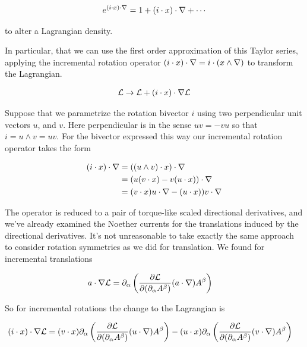 \begin{align}\label{eqn:rotationCurrents:foo1}
e^{(i \cdot x) \cdot \nabla} = 1 + (i \cdot x) \cdot \nabla + \cdots
\end{align}

to alter a Lagrangian density.

In particular, that we can use the first order approximation of this Taylor series, applying the incremental rotation operator $(i \cdot x) \cdot \nabla = i \cdot (x \wedge \nabla)$ to transform the Lagrangian.

\begin{align}\label{eqn:rotationCurrents:foo2}
\mathcal{L} \rightarrow \mathcal{L} + (i \cdot x) \cdot \nabla \mathcal{L}
\end{align}

Suppose that we parametrize the rotation bivector $i$ using two perpendicular unit vectors $u$, and $v$.  Here perpendicular is in the sense $u v = -v u$ so that $i = u \wedge v = u v$.  For the bivector expressed this way our incremental rotation operator takes the form

\begin{align*}
(i \cdot x) \cdot \nabla 
&=
((u \wedge v) \cdot x) \cdot \nabla \\
&=
(u (v \cdot x) - v (u \cdot x)) \cdot \nabla \\
&=
(v \cdot x) u \cdot \nabla - (u \cdot x)) v \cdot \nabla \\
\end{align*}

The operator is reduced to a pair of torque-like scaled directional derivatives, and we've already examined the Noether currents for the translations induced by the directional derivatives.  It's not unreasonable to take exactly the same approach to consider rotation symmetries as we did for translation.  We found for incremental translations

\begin{align}\label{eqn:rotationCurrents:foo3}
a \cdot \nabla \mathcal{L}
&=
\partial_\alpha \left(
\frac{\partial {\mathcal{L}}}{\partial {(\partial_\alpha A^\beta)}} (a \cdot \nabla) {A^\beta}
\right) 
\end{align}

So for incremental rotations the change to the Lagrangian is 

\begin{align}\label{eqn:rotationCurrents:foo4}
(i \cdot x) \cdot \nabla \mathcal{L}
&=
(v \cdot x)
\partial_\alpha \left(
\frac{\partial {\mathcal{L}}}{\partial {(\partial_\alpha A^\beta)}} (u \cdot \nabla) {A^\beta}
\right) 
-(u \cdot x)
\partial_\alpha \left(
\frac{\partial {\mathcal{L}}}{\partial {(\partial_\alpha A^\beta)}} (v \cdot \nabla) {A^\beta}
\right) 
\end{align}


